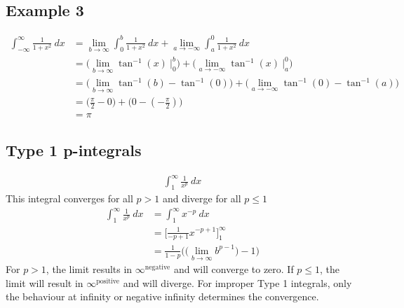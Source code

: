 \documentclass{article}
\theoremstyle{mytheoremstyle}
\theoremstyle{mytheoremstyle}
\theoremstyle{myproblemstyle}
\begin{document}
    \subsection*{Example 3}
    \begin{align*}
        \int_{-\infty}^{\infty} \frac{1}{1+x^2} \ dx
        &= \lim_{b\to \infty} \int_{0}^{b} \frac{1}{1+x^2} \ dx
         + \lim_{a\to -\infty} \int_{a}^{0} \frac{1}{1+x^2} \ dx \\
        &= \Big(\lim_{b\to \infty} \tan^{-1}(x) \ \Big|_{0}^{b}\Big)
         + \Big(\lim_{a\to -\infty} \tan^{-1}(x) \ \Big|_{a}^{0}\Big) \\
        &= \Big(\lim_{b\to \infty} \tan^{-1}(b) - \tan^{-1}(0)\Big)
         + \Big(\lim_{a\to -\infty} \tan^{-1}(0) - \tan^{-1}(a)\Big) \\
        &= \Big(\frac{\pi}{2} - 0\Big) + \Big(0 - (-\frac{\pi}{2})\Big) \\
        &= \pi
    \end{align*}

    \subsection*{Type 1 p-integrals}
    \begin{align*}
        \int_{1}^{\infty} \frac{1}{x^p} \ dx
    \end{align*}
    This integral converges for all $p>1$ and diverge for all $p\le1$
    \begin{align*}
        \int_{1}^{\infty} \frac{1}{x^p} \ dx
        &= \int_{1}^{\infty} x^{-p} \ dx \\
        &= \Big[ \frac{1}{-p+1} x^{-p+1} \Big]_{1}^{\infty} \\
        &= \frac{1}{1-p} \bigg(\big(\lim_{b\to \infty} b^{p-1}\big) - 1\bigg)
    \end{align*}
    For $p>1$, the limit results in $\infty^\text{negative}$ and will converge
    to zero. If $p\le1$, the limit will result in $\infty^\text{positive}$ and
    will diverge.
    For improper Type 1 integrals, only the behaviour at infinity or negative
    infinity determines the convergence.
\end{document}
